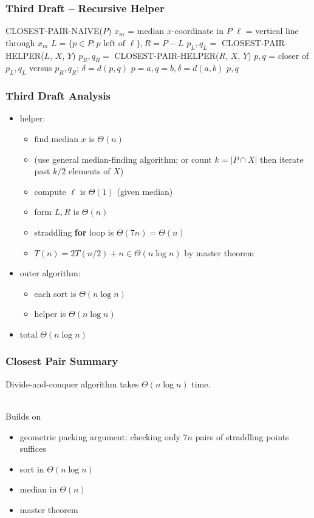 \documentclass{beamer}
\newcommand{\stanza}{ \\~\ }
\begin{document}
\begin{frame} \frametitle{Third Draft -- Recursive Helper}
  {\footnotesize
\begin{algorithmic}[1]
      \State \Return CLOSEST-PAIR-NAIVE($P$)
    \Else
      \State $x_m$ = median $x$-coordinate in $P$
      \State $\ell$ = vertical line through $x_m$
      \State $L = \{p \in P : p \text{ left of } \ell\}, R = P-L$
      \State $p_L, q_L = $ CLOSEST-PAIR-HELPER($L$, $X$, $Y$)
      \State $p_R, q_R = $ CLOSEST-PAIR-HELPER($R$, $X$, $Y$)
      \State $p, q$ = closer of $p_L, q_L$ versus $p_R, q_R$; $\delta=d(p,q)$
            \State $p=a, q=b, \delta=d(a,b)$
          \EndIf
        \EndFor
      \EndFor
      \State \Return $p, q$
    \EndIf
  \EndFunction
\end{algorithmic}
}
\end{frame}

\begin{frame} \frametitle{Third Draft Analysis}
\begin{itemize}
  \item helper:
    \begin{itemize}
      \item find median $x$ is $\Theta(n)$
      \item (use general median-finding algorithm; or count $k=|P \cap X|$
        then iterate past $k/2$ elements of $X$)
      \item compute $\ell$ is $\Theta(1)$ (given median)
      \item form $L, R$ is $\Theta(n)$
      \item straddling \textbf{for} loop is $\Theta(7n) = \Theta(n)$
      \item $T(n) = 2 T(n/2) + n \in \Theta(n \log n)$ by master theorem
    \end{itemize}
  \item outer algorithm:
    \begin{itemize}
      \item each sort is $\Theta(n \log n)$
      \item helper is $\Theta(n \log n)$
    \end{itemize}
  \item total $\Theta(n \log n)$
\end{itemize}
\end{frame}

\begin{frame} \frametitle{Closest Pair Summary}
Divide-and-conquer algorithm takes $\Theta(n \log n)$ time. \stanza

Builds on
\begin{itemize}
  \item geometric packing argument: checking only $7n$ pairs of straddling points suffices
  \item sort in $\Theta(n \log n)$
  \item median in $\Theta(n)$
  \item master theorem
\end{itemize}
\end{frame}
\end{document}
